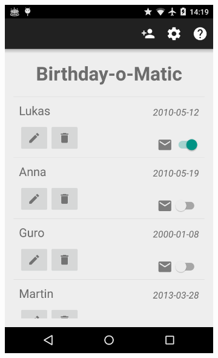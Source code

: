 \begin{figure}[ht]
\begin{subfigure}[b]{0.35\textwidth}
        \includegraphics[width=\textwidth]{./img/nexus4/1.png}
        \label{fig:res_liste}
    \end{subfigure}
    \begin{subfigure}[b]{0.35\textwidth}

\end{subfigure}
\end{figure}
